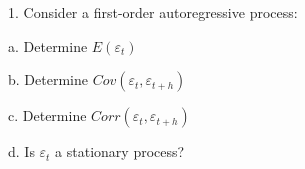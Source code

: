 \documentclass[12pt, utf8]{article}
\begin{document}
\newenvironment{problem}{\begin{framed}\begin{bfseries}}{\end{bfseries}\end{framed}\vspace{11pt}}


\begin{problem}

1. Consider a first-order autoregressive process:
  
a. Determine $E(\varepsilon_t)$

b. Determine $Cov(\varepsilon_t , \varepsilon_{t+h})$

c. Determine $Corr(\varepsilon_t , \varepsilon_{t+h})$

d. Is $\varepsilon_t$ a stationary process?
\end{problem}
\end{document}
